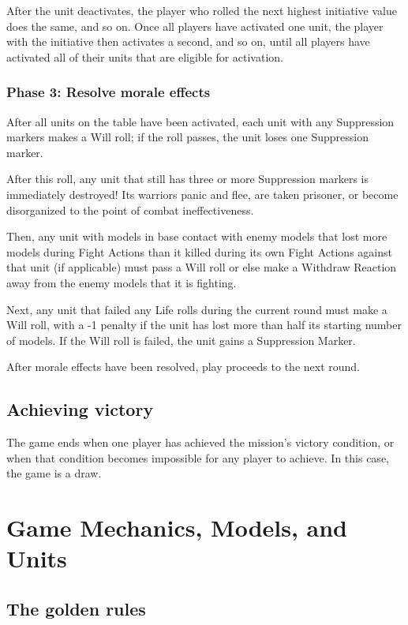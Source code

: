 \begin{multicols}{2}
After the unit deactivates, the player who rolled the next highest initiative value does the same, and so on. Once all players have activated one unit, the player with the initiative then activates a second, and so on, until all players have activated all of their units that are eligible for activation.


\subsection*{Phase 3: Resolve morale effects}

After all units on the table have been activated, each unit with any Suppression markers makes a Will roll; if the roll passes, the unit loses one Suppression marker.

After this roll, any unit that still has three or more Suppression markers is immediately destroyed! Its warriors panic and flee, are taken prisoner, or become disorganized to the point of combat ineffectiveness.

Then, any unit with models in base contact with enemy models that lost more models during Fight Actions than it killed during its own Fight Actions against that unit (if applicable) must pass a Will roll or else make a Withdraw Reaction away from the enemy models that it is fighting.

Next, any unit that failed any Life rolls during the current round must make a Will roll, with a -1 penalty if the unit has lost more than half its starting number of models. If the Will roll is failed, the unit gains a Suppression Marker.

After morale effects have been resolved, play proceeds to the next round.

\section*{Achieving victory}

The game ends when one player has achieved the mission's victory condition, or when that condition becomes impossible for any player to achieve. In this case, the game is a draw.




\chapter*{Game Mechanics, Models, and Units}

\section*{The golden rules}


\end{multicols}
